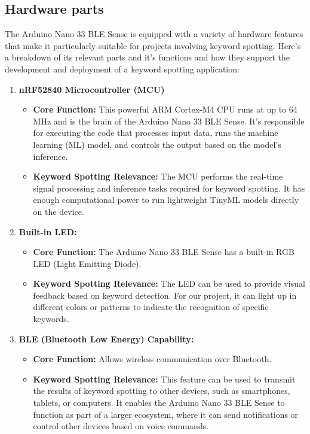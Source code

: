 \subsection{Hardware parts}

The Arduino Nano 33 BLE Sense is equipped with a variety of hardware features that make it particularly suitable for projects involving keyword spotting. Here’s a breakdown of its relevant parts and it's functions and how they support the development and deployment of a keyword spotting application:

\begin{enumerate}
	\item \textbf{nRF52840 Microcontroller (MCU)}
	\begin{itemize}
		\item \textbf{Core Function:} This powerful ARM Cortex-M4 CPU runs at up to 64 MHz and is the brain of the Arduino Nano 33 BLE Sense. It's responsible for executing the code that processes input data, runs the machine learning (ML) model, and controls the output based on the model's inference.
		\item \textbf{Keyword Spotting Relevance:} The MCU performs the real-time signal processing and inference tasks required for keyword spotting. It has enough computational power to run lightweight TinyML models directly on the device.
	\end{itemize}	
	\item \textbf{Built-in LED:}
	\begin{itemize}
		\item\textbf{ Core Function:} The Arduino Nano 33 BLE Sense has a built-in RGB LED (Light Emitting Diode).
		\item \textbf{Keyword Spotting Relevance:} The LED can be used to provide visual feedback based on keyword detection. For our project, it can light up in different colors or patterns to indicate the recognition of specific keywords.
	\end{itemize}
	\item \textbf{ BLE (Bluetooth Low Energy) Capability:}
	\begin{itemize}
		\item \textbf{Core Function:} Allows wireless communication over Bluetooth.
		\item \textbf{Keyword Spotting Relevance:} This feature can be used to transmit the results of keyword spotting to other devices, such as smartphones, tablets, or computers. It enables the Arduino Nano 33 BLE Sense to function as part of a larger ecosystem, where it can send notifications or control other devices based on voice commands.

\end{itemize}
\end{enumerate}
